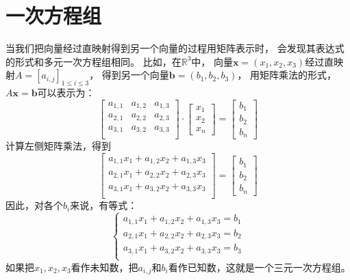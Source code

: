 \documentclass[12pt,UTF8]{ctexbook}
\begin{document}
\section{一次方程组}
当我们把向量经过直映射得到另一个向量的过程用矩阵表示时，
会发现其表达式的形式和多元一次方程组相同。
比如，在$\mathbb{R}^3$中，
向量$\mathbf{x} = (x_1, x_2, x_3)$经过直映射$A = [a_{i,j}]_{1\leqslant i \leqslant 3}$，
得到另一个向量$\mathbf{b} = (b_1, b_2, b_3)$，
用矩阵乘法的形式，$A\mathbf{x} = \mathbf{b}$可以表示为：
$$
    \begin{bmatrix}
        a_{1,1}     & a_{1,2}   & a_{1,3} \\
        a_{2,1}     & a_{2,2}   & a_{2,3} \\
        a_{3,1}     & a_{3,2}   & a_{3,3} \\
    \end{bmatrix} \cdot 
    \begin{bmatrix}
         x_{1} \\ x_{2} \\ x_{n} 
    \end{bmatrix} = 
    \begin{bmatrix}
        b_{1} \\ b_{2} \\ b_{n} 
    \end{bmatrix}
$$
计算左侧矩阵乘法，得到
$$
    \begin{bmatrix}
        a_{1,1} x_1 + a_{1,2} x_2 +  a_{1,3} x_3 \\
        a_{2,1} x_1 + a_{2,2} x_2 +  a_{2,3} x_3 \\
        a_{3,1} x_1 + a_{3,2} x_2 +  a_{3,3} x_3 \\
    \end{bmatrix} = 
    \begin{bmatrix}
        b_{1} \\ b_{2} \\ b_{n} 
    \end{bmatrix} 
$$
因此，对各个$b_i$来说，有等式：
$$
\left\{
    \begin{aligned}
        a_{1,1} x_1 + a_{1,2} x_2 +  a_{1,3} x_3 = b_1 \\
        a_{2,1} x_1 + a_{2,2} x_2 +  a_{2,3} x_3 = b_2 \\
        a_{3,1} x_1 + a_{3,2} x_2 +  a_{3,3} x_3 = b_3 \\
    \end{aligned}
\right.
$$
如果把$x_1, x_2, x_3$看作未知数，把$a_{i,j}$和$b_i$看作已知数，这就是一个三元一次方程组。
\end{document}
